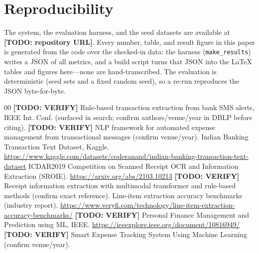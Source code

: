 \documentclass[conference]{IEEEtran}
\newcommand{\todo}[1]{{\color{red}\textbf{[TODO: #1]}}}
\begin{document}
\section*{Reproducibility}
The system, the evaluation harness, and the seed datasets are available at
\todo{repository URL}. Every number, table, and result figure in this paper is
generated from the code over the checked-in data: the harness
(\texttt{make\_results}) writes a JSON of all metrics, and a build script turns
that JSON into the \LaTeX{} tables and figures here---none are hand-transcribed.
The evaluation is deterministic (seed sets and a fixed random seed), so a
re-run reproduces the JSON byte-for-byte.

\begin{thebibliography}{00}
 \todo{VERIFY} Rule-based transaction extraction from bank SMS
alerts, IEEE Int. Conf. (surfaced in search; confirm authors/venue/year in DBLP
before citing).
 \todo{VERIFY} NLP framework for automated expense
management from transactional messages (confirm venue/year).
 Indian Banking Transaction Text Dataset, Kaggle.
\url{https://www.kaggle.com/datasets/coderanand/indian-banking-transaction-text-dataset}
 ICDAR2019 Competition on Scanned Receipt OCR and Information
Extraction (SROIE). \url{https://arxiv.org/abs/2103.10213}
 \todo{VERIFY} Receipt information extraction with multimodal
transformer and rule-based methods (confirm exact reference).
 Line-item extraction accuracy benchmarks (industry report).
\url{https://www.veryfi.com/technology/line-item-extraction-accuracy-benchmarks/}
 \todo{VERIFY} Personal Finance Management and Prediction using ML,
IEEE. \url{https://ieeexplore.ieee.org/document/10816949/}
 \todo{VERIFY} Smart Expense Tracking System Using Machine
Learning (confirm venue/year).
\end{thebibliography}
\end{document}
